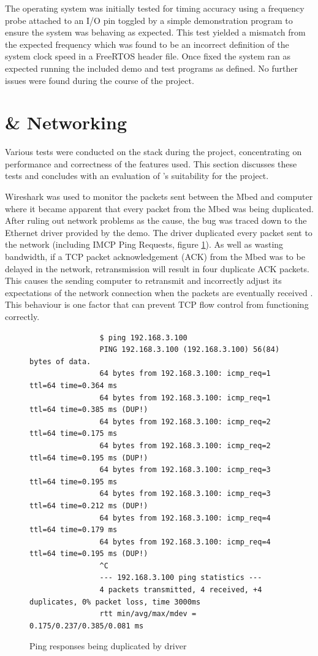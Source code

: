 		The operating system was initially tested for timing accuracy using a
		frequency probe attached to an I/O pin toggled by a simple demonstration
		program to ensure the system was behaving as expected. This test yielded a
		mismatch from the expected frequency which was found to be an incorrect
		definition of the system clock speed in a FreeRTOS header file. Once fixed
		the system ran as expected running the included demo and test programs as
		defined. No further issues were found during the course of the project.
	
	\section{\uIP{} \& Networking}
		
		Various tests were conducted on the \uIP{} stack during the project,
		concentrating on performance and correctness of the features used. This
		section discusses these tests and concludes with an evaluation of \uIP{}'s
		suitability for the project.
		
		
		\label{sec:udpPerformance}
		
		Wireshark was used to monitor the packets sent between the Mbed and computer
		where it became apparent that every packet from the Mbed was being
		duplicated. After ruling out network problems as the cause, the bug was
		traced down to the Ethernet driver provided by the demo. The driver
		duplicated every packet sent to the network (including IMCP Ping Requests,
		figure \ref{fig:ping}). As well as wasting bandwidth, if a TCP packet
		acknowledgement (ACK) from the Mbed was to be delayed in the network,
		retransmission will result in four duplicate ACK packets. This causes the
		sending computer to retransmit and incorrectly adjust its expectations of
		the network connection when the packets are eventually received
		\cite{duplicateack}. This behaviour is one factor that can prevent TCP flow
		control from functioning correctly.
		
		\begin{figure}
			\begin{verbatim}
				$ ping 192.168.3.100
				PING 192.168.3.100 (192.168.3.100) 56(84) bytes of data.
				64 bytes from 192.168.3.100: icmp_req=1 ttl=64 time=0.364 ms
				64 bytes from 192.168.3.100: icmp_req=1 ttl=64 time=0.385 ms (DUP!)
				64 bytes from 192.168.3.100: icmp_req=2 ttl=64 time=0.175 ms
				64 bytes from 192.168.3.100: icmp_req=2 ttl=64 time=0.195 ms (DUP!)
				64 bytes from 192.168.3.100: icmp_req=3 ttl=64 time=0.195 ms
				64 bytes from 192.168.3.100: icmp_req=3 ttl=64 time=0.212 ms (DUP!)
				64 bytes from 192.168.3.100: icmp_req=4 ttl=64 time=0.179 ms
				64 bytes from 192.168.3.100: icmp_req=4 ttl=64 time=0.195 ms (DUP!)
				^C
				--- 192.168.3.100 ping statistics ---
				4 packets transmitted, 4 received, +4 duplicates, 0% packet loss, time 3000ms
				rtt min/avg/max/mdev = 0.175/0.237/0.385/0.081 ms
			\end{verbatim}
			\caption{Ping responses being duplicated by \uIP{} driver}
			\label{fig:ping}
		\end{figure}
		
